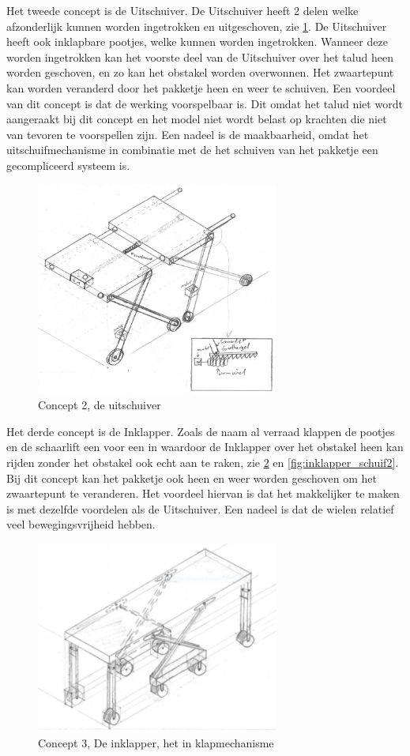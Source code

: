 Het tweede concept is de Uitschuiver. De Uitschuiver heeft 2 delen welke afzonderlijk kunnen worden ingetrokken en uitgeschoven, zie \cref{fig:isom_uitschuiver2}. De Uitschuiver heeft ook inklapbare pootjes, welke kunnen worden ingetrokken. Wanneer deze worden ingetrokken kan het voorste deel van de Uitschuiver over het talud heen worden geschoven, en zo kan het obstakel worden overwonnen. Het zwaartepunt kan worden veranderd door het pakketje heen en weer te schuiven. Een voordeel van dit concept is dat de werking voorspelbaar is. Dit omdat het talud niet wordt aangeraakt bij dit concept en het model niet wordt belast op krachten die niet van tevoren te voorspellen zijn. Een nadeel is de maakbaarheid, omdat het uitschuifmechanisme in combinatie met de het schuiven van het pakketje een gecompliceerd systeem is.

\begin{figure}[!htp]
    \centering
    \includegraphics[width=80mm]{04_idee_ontwikkeling/isom_uitschuiver.png}
    \caption{Concept 2, de uitschuiver}
    \label{fig:isom_uitschuiver2}
\end{figure}

Het derde concept is de Inklapper. Zoals de naam al verraad klappen de pootjes en de schaarlift een voor een in waardoor de Inklapper over het obstakel heen kan rijden zonder het obstakel ook echt aan te raken, zie \cref{fig:inklapper2} en \cref{fig:inklapper_schuif2}. Bij dit concept kan het pakketje ook heen en weer worden geschoven om het zwaartepunt te veranderen. Het voordeel hiervan is dat het makkelijker te maken is met dezelfde voordelen als de Uitschuiver. Een nadeel is dat de wielen relatief veel bewegingsvrijheid hebben. 

\begin{figure}[H]
    \centering
    \includegraphics[width = 80mm]{04_idee_ontwikkeling/Foto_inklapper.PNG}
    \caption{Concept 3, De inklapper, het in klapmechanisme}
    \label{fig:inklapper2}
\end{figure}

